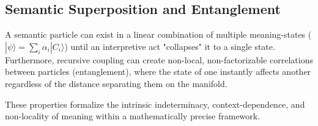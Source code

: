 
\subsection{Semantic Superposition and Entanglement}
\label{sec:semantic_superposition_and_entanglement}

A semantic particle can exist in a linear combination of multiple meaning-states (\(|\psi\rangle = \sum_i \alpha_i |C_i\rangle\)) until an interpretive act "collapses" it to a single state. Furthermore, recursive coupling can create non-local, non-factorizable correlations between particles (entanglement), where the state of one instantly affects another regardless of the distance separating them on the manifold.

These properties formalize the intrinsic indeterminacy, context-dependence, and non-locality of meaning within a mathematically precise framework. 